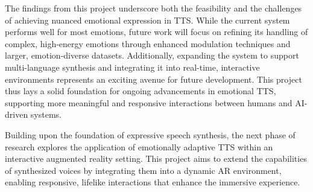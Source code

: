 The findings from this project underscore both the feasibility and the challenges of achieving nuanced emotional expression in TTS. While the current system performs well for most emotions, future work will focus on refining its handling of complex, high-energy emotions through enhanced modulation techniques and larger, emotion-diverse datasets. Additionally, expanding the system to support multi-language synthesis and integrating it into real-time, interactive environments represents an exciting avenue for future development. This project thus lays a solid foundation for ongoing advancements in emotional TTS, supporting more meaningful and responsive interactions between humans and AI-driven systems.

Building upon the foundation of expressive speech synthesis, the next phase of research explores the application of emotionally adaptive TTS within an interactive augmented reality setting. This project aims to extend the capabilities of synthesized voices by integrating them into a dynamic AR environment, enabling responsive, lifelike interactions that enhance the immersive experience.
